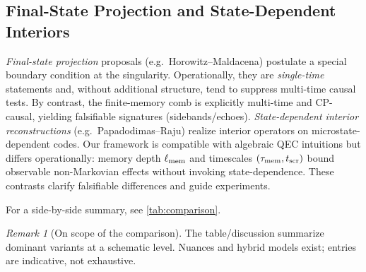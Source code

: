 \documentclass[aps,prd,preprint,onecolumn,superscriptaddress,nofootinbib,longbibliography,floatfix,11pt,showpacs,showkeys]{revtex4-2}
\theoremstyle{plain}
\theoremstyle{definition}
\theoremstyle{remark}
\newtheorem{remark}[theorem]{Remark}
\begin{document}
\subsection{Final-State Projection and State-Dependent Interiors}
\emph{Final-state projection} proposals (e.g.\ Horowitz--Maldacena) postulate a special boundary condition at the singularity.
Operationally, they are \emph{single-time} statements and, without additional structure, tend to suppress multi-time causal tests.
By contrast, the finite-memory comb is explicitly multi-time and CP-causal, yielding falsifiable signatures (sidebands/echoes).
\emph{State-dependent interior reconstructions} (e.g.\ Papadodimas--Raju) realize interior operators on microstate-dependent codes.
Our framework is compatible with algebraic QEC intuitions but differs operationally: memory depth $\ell_{\rm mem}$ and
timescales $(\tau_{\rm mem},t_{\rm scr})$ bound observable non-Markovian effects without invoking state-dependence.
These contrasts clarify falsifiable differences and guide experiments.

For a side-by-side summary, see \cref{tab:comparison}.

\begin{remark}[On scope of the comparison]
The table/discussion summarize dominant variants at a schematic level. Nuances and hybrid models exist; entries are indicative, not exhaustive.
\end{remark}
\end{document}
